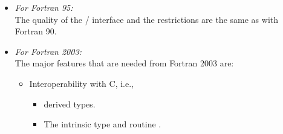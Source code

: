 \begin{itemize}
\begin{itemize}
       Only in :
       The implicit interfaces for routines with choice buffer arguments imply
       that the  argument cannot be defined as .
       For this reason, it is recommended not to provide the 
       module if such an extension is not available.
   \item
       The  attribute can \textbf{not} be used in applications
       to protect buffers in nonblocking \MPI/ calls (--).
   \item
       The  binding of the
        and  routines
       is not available.
   \item
       In  and ,
       the definition of the handle types (e.g., 
       and the status type 
       must be modified: The  attribute must be used
       instead of  (which is not available in Fortran 90/95).
       This restriction implies that the application must be fully recompiled
       if one switches to an \MPI/ library for Fortran 2003 and later
       because the internal memory size of the handles may have changed.
       For this reason, an implementor may choose not to provide
       the  module for Fortran 90 compilers.
       In this case, the  handle types and all routines, constants and
       types related to 
       (see )
       are also not available in the  module and .
  \end{itemize}
\item
  \emph{For Fortran 95:} \\
  The quality of the \MPI/ interface and the restrictions
  are the same as with Fortran 90.
\item
  \emph{For Fortran 2003:} \\
  The major features that are needed from Fortran 2003 are:
   \begin{itemize}
   \item Interoperability with C, i.e.,
    \begin{itemize}
     \item {} derived types.
     \item The  intrinsic type 
           and routine .
    \end{itemize}

\end{itemize}
\end{itemize}
